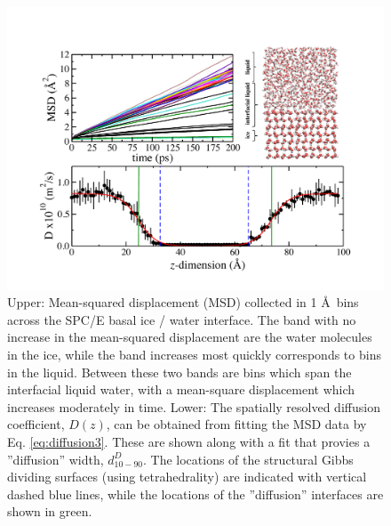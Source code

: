 \begin{figure}
\includegraphics[width=\linewidth]{Figures/DzSPCE}
\caption{\label{fig:DzSPCE} Upper: Mean-squared displacement (MSD)
  collected in 1 \AA~bins across the SPC/E basal ice / water
  interface. The band with no increase in the mean-squared
  displacement are the water molecules in the ice, while the band
  increases most quickly corresponds to bins in the liquid. Between
  these two bands are bins which span the interfacial liquid water,
  with a mean-square displacement which increases moderately in
  time. Lower: The spatially resolved diffusion coefficient, $D(z)$,
  can be obtained from fitting the MSD data by
  Eq. \eqref{eq:diffusion3}. These are shown along with a fit that
  provies a ''diffusion'' width, $d_{10-90}^{D}$. The locations of
  the structural Gibbs dividing surfaces (using tetrahedrality) are
  indicated with vertical dashed blue lines, while the locations of
  the ''diffusion'' interfaces are shown in green.  }
\end{figure}

